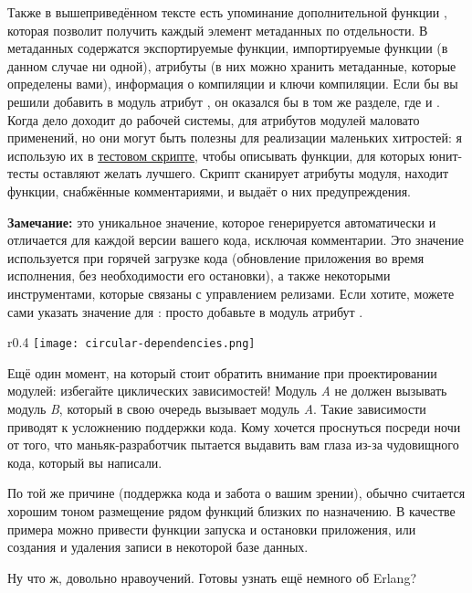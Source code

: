 Также в вышеприведённом тексте есть упоминание дополнительной функции , которая позволит получить каждый элемент метаданных по отдельности.
В метаданных содержатся экспортируемые функции, импортируемые функции (в данном случае ни одной), атрибуты (в них можно хранить метаданные, которые определены вами), информация о компиляции и ключи компиляции.
Если бы вы решили добавить в модуль атрибут , он оказался бы в том же разделе, где и .
Когда дело доходит до рабочей системы, для атрибутов модулей маловато применений, но они могут быть полезны для реализации маленьких хитростей: я использую их в \href{http://learnyousomeerlang.com/static/erlang/tester.erl}{тестовом скрипте}, чтобы описывать функции, для которых юнит\--тесты оставляют желать лучшего.
Скрипт сканирует атрибуты модуля, находит функции, снабжённые комментариями, и выдаёт о них предупреждения.\\ 
\colorbox{lgray}
{
    \begin{minipage}{1\linewidth}
        \textbf{Замечание:}  это уникальное значение, которое генерируется автоматически и отличается для каждой версии вашего кода, исключая комментарии.
        Это значение используется при горячей загрузке кода (обновление приложения во время исполнения, без необходимости его остановки), а также некоторыми инструментами, которые связаны с управлением релизами.
        Если хотите, можете сами указать значение для : просто добавьте в модуль атрибут .
    \end{minipage}
}

\begin{wrapfigure}{r}{0.4\linewidth}
    \texttt{[image: circular-dependencies.png]}
\end{wrapfigure}
Ещё один момент, на который стоит обратить внимание при проектировании модулей: избегайте циклических зависимостей!
Модуль \emph{A} не должен вызывать модуль \emph{B}, который в свою очередь вызывает модуль \emph{A}.
Такие зависимости приводят к усложнению поддержки кода.
Кому хочется проснуться посреди ночи от того, что маньяк\--разработчик пытается выдавить вам глаза из\--за чудовищного кода, который вы написали.

По той же причине (поддержка кода и забота о вашим зрении), обычно считается хорошим тоном размещение рядом функций близких по назначению.
В качестве примера можно привести функции запуска и остановки приложения, или создания и удаления записи в некоторой базе данных.

Ну что ж, довольно нравоучений.
Готовы узнать ещё немного об Erlang?
